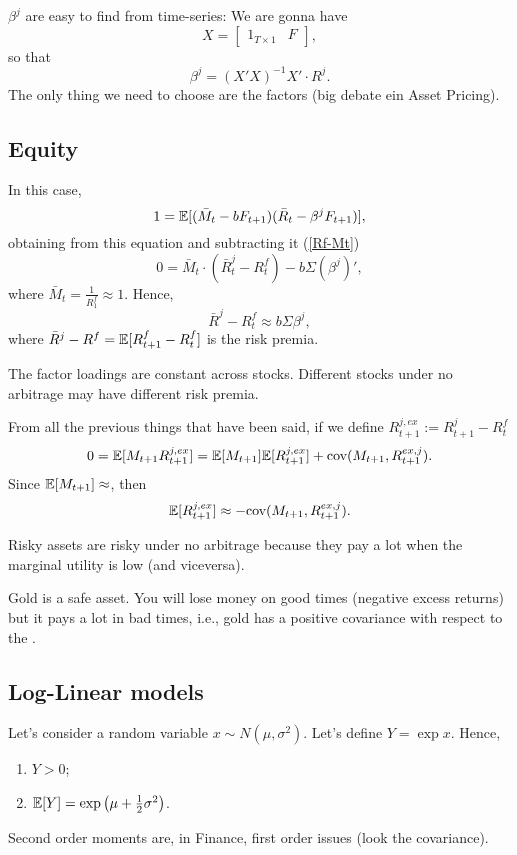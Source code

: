 \note $\beta^j$ are easy to find from time-series: We are gonna have
$$
	X = \begin{bmatrix}
		1_{T\times 1} & F
	\end{bmatrix},
$$
so that
$$
	\beta^j = (X' X)^{-1}X'\cdot R^j.
$$
The only thing we need to choose are the factors (big debate ein Asset Pricing). 

\subsection{Equity}
In this case,
$$
	1 = \mathbb{E}[(\bar{M}_t-bF_{t+1})(\bar{R}_{t}-\beta^j F_{t+1})],
$$
obtaining from this equation and subtracting it (\ref{Rf-Mt})
$$
	 0 = \bar{M}_t \cdot\left(\bar{R}_t^j-R_t^f\right) - b\Sigma(\beta^j)',
$$
where $\bar{M}_t = \frac{1}{R^f_1}\approx 1$. Hence,
$$
	\bar{R}^j - R^f_t \approx b \Sigma \beta^j,
$$
where $\bar{R}^j - R^f  = \mathbb{E}[R^f_{t+1}-R_t^f]$ is the risk premia.

\note The factor loadings are constant across stocks. Different stocks under no arbitrage may have different risk premia.

From all the previous things that have been said, if we define $R_{t+1}^{j,ex} := R_{t+1}^j - R_t^f$
$$
	 0 = \mathbb{E}[M_{t+1}R_{t+1}^{j, ex}] = \mathbb{E}[M_{t+1}]\mathbb{E}[R_{t+1}^{j,ex}]  +\text{cov}(M_{t+1}, R^{ex,j}_{t+1}). 
$$
Since $\mathbb{E}[M_{t+1}] \approx$, then
\begin{equation}
	\mathbb{E}[R_{t+1}^{j,ex}] \approx -\text{cov}(M_{t+1}, R^{ex,j}_{t+1}).
\end{equation}

Risky assets are risky under no arbitrage because they pay a lot when the marginal utility is low (and viceversa). 

Gold is a safe asset. You will lose money on good times (negative excess returns) but it pays a lot in bad times, i.e., gold has a positive covariance with respect to the \sdf.

\subsection{Log-Linear models}

Let's consider a random variable $x\sim N(\mu, \sigma^2)$. Let's define $Y = \exp x$. Hence,
\begin{enumerate}[wide, itemsep=0cm, topsep=0cm]
	\item $Y > 0$;
	\item $\mathbb{E}[Y] = \exp \left(\mu + \frac{1}{2}\sigma^2\right)$.
\end{enumerate}
\note Second order moments are, in Finance, first order issues (look the covariance).

